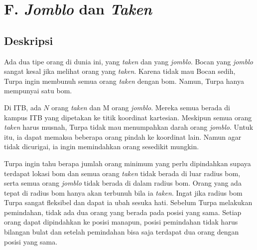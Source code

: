 \documentclass{article}
\begin{document}
\pagestyle{fancy}
\fancyhf{}
\renewcommand{\headrulewidth}{0pt}

\section*{\hfil F. \textit{Jomblo} dan \textit{Taken}\hfil}


\subsection*{Deskripsi}

\par\noindent Ada dua tipe orang di dunia ini, yang \textit{taken} dan yang \textit{jomblo}. Bocan yang \textit{jomblo} sangat kesal jika melihat orang yang \textit{taken}. Karena tidak mau Bocan sedih, Turpa ingin membunuh semua orang \textit{taken} dengan bom. Namun, Turpa hanya mempunyai satu bom.

\par\noindent Di ITB, ada $N$ orang \textit{taken} dan M orang \textit{jomblo}. Mereka semua berada di kampus ITB yang dipetakan ke titik koordinat kartesian. Meskipun semua orang \textit{taken} harus musnah, Turpa tidak mau menumpahkan darah orang \textit{jomblo}. Untuk itu, ia dapat memaksa beberapa orang pindah ke koordinat lain. Namun agar tidak dicurigai, ia ingin memindahkan orang sesedikit mungkin.

\par\noindent Turpa ingin tahu berapa jumlah orang minimum yang perlu dipindahkan supaya terdapat lokasi bom dan semua orang \textit{taken} tidak berada di luar radius bom, serta semua orang \textit{jomblo} tidak berada di dalam radius bom. Orang yang ada tepat di radius bom hanya akan terbunuh bila ia \textit{taken}. Ingat jika radius bom Turpa sangat fleksibel dan dapat ia ubah sesuka hati. Sebelum Turpa melakukan pemindahan, tidak ada dua orang yang berada pada posisi yang
sama. Setiap orang dapat dipindahkan ke posisi manapun, posisi pemindahan tidak harus bilangan bulat dan setelah pemindahan bisa saja terdapat dua orang dengan posisi yang sama.
\end{document}
